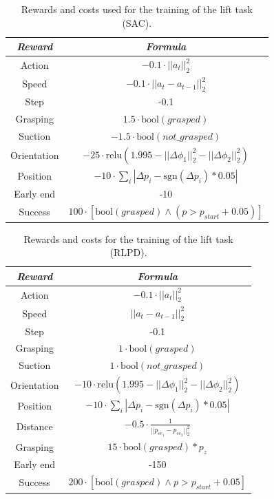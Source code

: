 \documentclass[letterpaper, 10 pt, conference]{ieeeconf}  %
\begin{document}
\begin{table}[H]
    \centering
    \caption{Rewards and costs used for the training of the lift task (SAC).}
    \renewcommand{\arraystretch}{1.5}
    \begin{tabular}{c|c}
    \toprule \textbf{\textit{Reward}} & \textbf{\textit{Formula}}\\
    \midrule Action & $-0.1\cdot || a_{t} ||^2_2$\\
    Speed & $-0.1\cdot || a_t -  a_{t-1}||^2_2$\\
    Step & -0.1\\
    Grasping & $1.5\cdot \text{bool}(grasped) $\\
    Suction & $-1.5\cdot \text{bool}(not\_grasped)$\\
    Orientation & $-25\cdot \text{relu}(1.995 - ||\Delta\phi_{1}||^2_2 - ||\Delta\phi_{2}||^2_2)$\\
    Position & $-10\cdot \sum_i |\Delta p_{i} - \text{sgn}(\Delta p_{i})* 0.05| $\\
    Early end & -10\\
    Success & $100\cdot [\text{bool}(grasped)\land (p>p_{start}+ 0.05)]$\\
    \bottomrule
    \end{tabular}
    \label{lift_rew_sac}
\end{table}

\begin{table}[H]
    \centering
    \caption{Rewards and costs for the training of the lift task (RLPD).}
    \renewcommand{\arraystretch}{1.5}
    \begin{tabular}{c|c}
    \toprule \textbf{\textit{Reward}} & \textbf{\textit{Formula}}\\
    \midrule Action & $-0.1\cdot || a_{t} ||^2_2$\\
    Speed & $|| a_t - a_{t-1}||^2_2$ \\
    Step & -0.1\\
    Grasping & $1\cdot\text{bool}(grasped) $\\
    Suction & $1\cdot\text{bool}(not\_grasped) $ \\
    Orientation & $-10\cdot \text{relu}(1.995 - ||\Delta\phi_{1}||^2_2 - ||\Delta\phi_{2}||^2_2)$ \\
    Position & $-10\cdot \sum_i |\Delta p_{i} - \text{sgn}(\Delta p_{i})* 0.05| $\\
    Distance & $-0.5\cdot \frac{1}{||p_{ee_1} - p_{ee_2}||^2_2}$\\
    Grasping & $15\cdot \text{bool}(grasped) * p_z$\\
    Early end & -150\\
    Success & $200\cdot [\text{bool}(grasped)\land p >p_{start}+ 0.05]$ \\
    \bottomrule
    \end{tabular}
    \label{lift_rew_voxnet}
\end{table}
\end{document}
